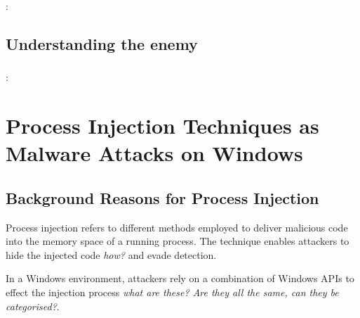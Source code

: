 \documentclass{article}
\begin{document}
\subsubsection{\textcite{CVE-2023-3519}}
\textbf{}: 



\subsection{Understanding the enemy}

\subsubsection{\textcite{CISA:2023}}
\textbf{}: 







\section{Process Injection Techniques as Malware Attacks on Windows}

\subsection{Background Reasons for Process Injection}

Process injection refers to different methods employed to deliver malicious code into the memory space of a
running process.  The technique enables attackers to hide the injected code \textit{how?} and evade detection.

In a Windows \faWindows \space environment, attackers rely on a combination of Windows APIs to effect the injection
process \textit{what are these? Are they all the same, can they be categorised?}.
\end{document}

